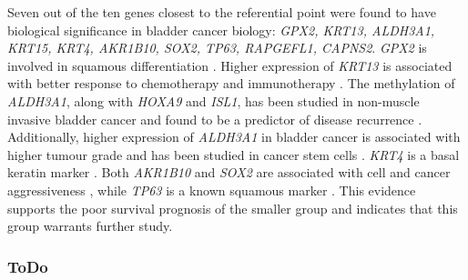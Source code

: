 Seven out of the ten genes closest to the referential point were found to have biological significance in bladder cancer biology: \textit{GPX2, KRT13, ALDH3A1, KRT15, KRT4, AKR1B10, SOX2, TP63, RAPGEFL1, CAPNS2}. \textit{GPX2} is involved in squamous differentiation \citet{Naiki2018-fp}. Higher expression of \textit{KRT13} is associated with better response to chemotherapy and immunotherapy \citet{Yu2023-db}. The methylation of \textit{ALDH3A1}, along with \textit{HOXA9} and \textit{ISL1}, has been studied in non-muscle invasive bladder cancer and found to be a predictor of disease recurrence \citet{McLean2023-qk}. Additionally, higher expression of \textit{ALDH3A1} in bladder cancer is associated with higher tumour grade and has been studied in cancer stem cells \citet{Kim2013-th}. \textit{KRT4} is a basal keratin marker \citet{Marzouka2018-ge}. Both \textit{AKR1B10} and \textit{SOX2} are associated with cell and cancer aggressiveness \citet{Huang2021-bn, Chiu2020-xh}, while \textit{TP63} is a known squamous marker \citet{Robertson2017-mg}. This evidence supports the poor survival prognosis of the smaller group and indicates that this group warrants further study.







% 


\newpage


\subsubsection{ToDo}

